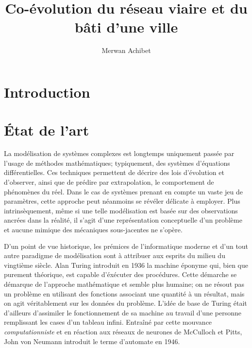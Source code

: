 \documentclass[10pt,twocolumn]{article}
\title{Co-évolution du réseau viaire et du bâti d'une ville}
\author{Merwan Achibet}
\date{}
\begin{document}
\maketitle

\begin{abstract}

\end{abstract}

\section{Introduction}

\section{\'Etat de l'art}

La modélisation de systèmes complexes est longtemps uniquement passée
par l'usage de méthodes mathématiques; typiquement, des systèmes
d'équations différentielles. Ces techniques permettent de décrire des
lois d'évolution et d'observer, ainsi que de prédire par
extrapolation, le comportement de phénomènes du réel. Dans le cas de
systèmes prenant en compte un vaste jeu de paramètres, cette approche
peut néanmoins se révéler délicate à employer. Plus intrinsèquement,
même si une telle modélisation est basée sur des observations ancrées
dans la réalité, il s'agit d'une représentation conceptuelle d'un
problème et aucune mimique des mécaniques sous-jacentes ne s'opère.

D'un point de vue historique, les prémices de l'informatique moderne
et d'un tout autre paradigme de modélisation sont à attribuer aux
esprits du milieu du vingtième siècle. Alan Turing introduit en 1936
la machine éponyme qui, bien que purement théorique, est capable
d'éxécuter des procédures. Cette démarche se démarque de l'approche
mathématique et semble plus humaine; on ne résout pas un problème en
utilisant des fonctions associant une quantité à un résultat, mais on
agit véritablement sur les données du problème. L'idée de base de
Turing était d'ailleurs d'assimiler le fonctionnement de sa machine au
travail d'une personne remplissant les cases d'un tableau
infini. Entraîné par cette mouvance \textit{computationniste} et en
réaction aux réseaux de neurones de McCulloch et Pitts, John von
Neumann introduit le terme d'automate en 1946.
\end{document}

